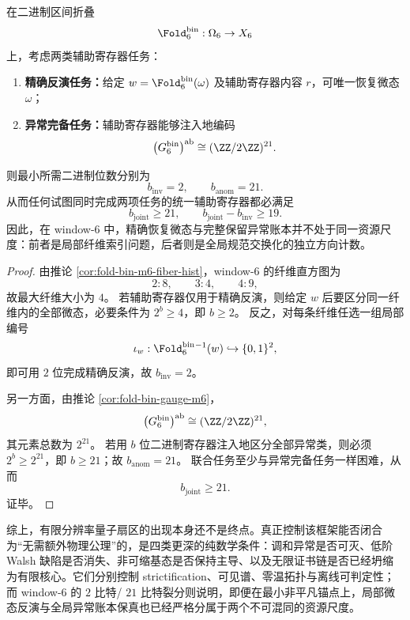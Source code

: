\begin{theorem}\label{thm:conclusion-window6-inversion-anomaly-information-separation}
在二进制区间折叠
\[
\Fold_6^{\mathrm{bin}}:\Omega_6\to X_6
\]
上，考虑两类辅助寄存器任务：
\begin{enumerate}
  \item \textbf{精确反演任务：}给定 \(w=\Fold_6^{\mathrm{bin}}(\omega)\) 及辅助寄存器内容 \(r\)，可唯一恢复微态 \(\omega\)；
  \item \textbf{异常完备任务：}辅助寄存器能够注入地编码
  \[
  \bigl(G_6^{\mathrm{bin}}\bigr)^{\mathrm{ab}}
  \cong
  (\ZZ/2\ZZ)^{21}.
  \]
\end{enumerate}
则最小所需二进制位数分别为
\[
b_{\mathrm{inv}}=2,
\qquad
b_{\mathrm{anom}}=21.
\]
从而任何试图同时完成两项任务的统一辅助寄存器都必满足
\[
b_{\mathrm{joint}}\ge 21,
\qquad
b_{\mathrm{joint}}-b_{\mathrm{inv}}\ge 19.
\]
因此，在 window-\(6\) 中，精确恢复微态与完整保留异常账本并不处于同一资源尺度：前者是局部纤维索引问题，后者则是全局规范交换化的独立方向计数。
\end{theorem}
\begin{proof}
由推论 \ref{cor:fold-bin-m6-fiber-hist}，window-\(6\) 的纤维直方图为
\[
2:8,\qquad 3:4,\qquad 4:9,
\]
故最大纤维大小为 \(4\)。
若辅助寄存器仅用于精确反演，则给定 \(w\) 后要区分同一纤维内的全部微态，必要条件为 \(2^b\ge 4\)，即 \(b\ge 2\)。
反之，对每条纤维任选一组局部编号
\[
\iota_w:\Fold_6^{\mathrm{bin}}{}^{-1}(w)\hookrightarrow \{0,1\}^2,
\]
即可用 \(2\) 位完成精确反演，故 \(b_{\mathrm{inv}}=2\)。

另一方面，由推论 \ref{cor:fold-bin-gauge-m6}，
\[
\bigl(G_6^{\mathrm{bin}}\bigr)^{\mathrm{ab}}\cong (\ZZ/2\ZZ)^{21},
\]
其元素总数为 \(2^{21}\)。
若用 \(b\) 位二进制寄存器注入地区分全部异常类，则必须 \(2^b\ge 2^{21}\)，即 \(b\ge 21\)；故 \(b_{\mathrm{anom}}=21\)。
联合任务至少与异常完备任务一样困难，从而
\[
b_{\mathrm{joint}}\ge 21.
\]
证毕。
\end{proof}

综上，有限分辨率量子扇区的出现本身还不是终点。真正控制该框架能否闭合为“无需额外物理公理”的，是四类更深的纯数学条件：调和异常是否可灭、低阶 Walsh 缺陷是否消失、非可缩基态是否保持主导、以及无限证书链是否已经坍缩为有限核心。它们分别控制 strictification、可见谱、零温拓扑与离线可判定性；而 window-\(6\) 的 \(2\) 比特/ \(21\) 比特裂分则说明，即便在最小非平凡锚点上，局部微态反演与全局异常账本保真也已经严格分属于两个不可混同的资源尺度。
